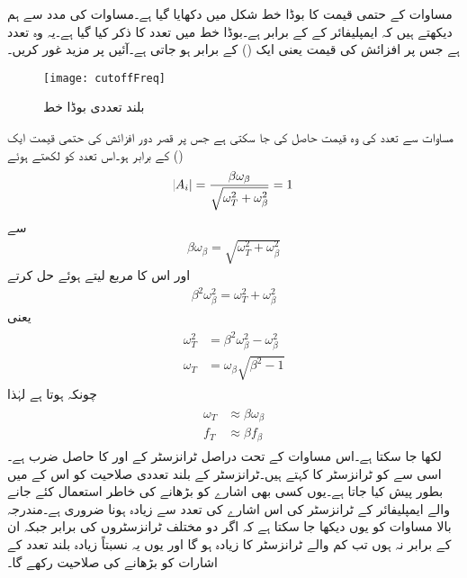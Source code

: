 مساوات  کے حتمی قیمت کا بوڈا خط شکل  میں دکھایا گیا ہے۔مساوات  کی مدد سے ہم دیکھتے ہیں کہ  ایمپلیفائر کے   کے برابر ہے۔بوڈا خط میں  تعدد کا ذکر کیا گیا ہے۔یہ وہ تعدد ہے جس پر افزائش کی قیمت  یعنی ایک () کے برابر ہو جاتی ہے۔آئیں  پر مزید غور کریں۔
\begin{figure}
\centering
\texttt{[image: cutoffFreq]}
\caption{بلند تعددی بوڈا خط}
\label{شکل_تعددی_ردعمل_بلند_تعددی_بوڈا_خط}
\end{figure}
مساوات  سے تعدد کی وہ قیمت حاصل کی جا سکتی ہے جس پر قصر دور افزائش کی حتمی قیمت ایک () کے برابر ہو۔اس تعدد کو  لکھتے ہوئے
\begin{align*}
\abs{A_i}=\frac{\beta \omega_{\beta} }{\sqrt{\omega_T^2+\omega_{\beta}^2 }}=1
\end{align*}
سے
\begin{align*}
\beta \omega_{\beta} =\sqrt{\omega_T^2+\omega_{\beta}^2 }
\end{align*}
اور اس کا مربع لیتے ہوئے حل کرتے
\begin{align*}
\beta^2 \omega_{\beta}^2 =\omega_T^2+\omega_{\beta}^2 
\end{align*}
یعنی
\begin{gather}
\begin{aligned}
\omega_T^2 &=\beta^2 \omega_{\beta}^2 -\omega_{\beta}^2 \\
\omega_T &=\omega_{\beta}\sqrt{\beta^2 -1}
\end{aligned}
\end{gather}
چونکہ  ہوتا ہے لہٰذا
\begin{gather}
\begin{aligned} \label{مساوات_تعددی_ردعمل_افزائش_ضرب_دائرہ}
\omega_T & \approx \beta \omega_{\beta} \\
f_T & \approx \beta f_{\beta}
\end{aligned}
\end{gather}
لکھا جا سکتا ہے۔اس مساوات کے تحت  دراصل ٹرانزسٹر کے  اور  کا حاصل ضرب ہے۔اسی سے  کو ٹرانزسٹر کا  کہتے ہیں۔ٹرانزسٹر کے بلند تعددی صلاحیت کو اس کے  میں بطور  پیش کیا جاتا ہے۔یوں کسی بھی اشارے کو بڑھانے کی خاطر استعمال کئے جانے والے ایمپلیفائر کے ٹرانزسٹر کی  اس اشارے کی تعدد سے زیادہ ہونا ضروری ہے۔مندرجہ بالا مساوات کو یوں دیکھا جا سکتا ہے کہ اگر دو مختلف ٹرانزسٹروں کی  برابر جبکہ ان کے  برابر نہ ہوں تب کم  والے ٹرانزسٹر کا  زیادہ ہو گا اور یوں یہ نسبتاً زیادہ بلند تعدد کے اشارات کو بڑھانے کی صلاحیت رکھے گا۔

